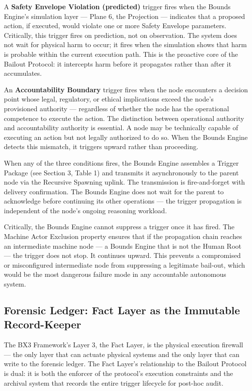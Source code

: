 A \textbf{Safety Envelope Violation (predicted)} trigger fires when the Bounds Engine's simulation layer — Plane 6, the Projection — indicates that a proposed action, if executed, would violate one or more Safety Envelope parameters. Critically, this trigger fires on prediction, not on observation. The system does not wait for physical harm to occur; it fires when the simulation shows that harm is probable within the current execution path. This is the proactive core of the Bailout Protocol: it intercepts harm before it propagates rather than after it accumulates.

An \textbf{Accountability Boundary} trigger fires when the node encounters a decision point whose legal, regulatory, or ethical implications exceed the node's provisioned authority — regardless of whether the node has the operational competence to execute the action. The distinction between operational authority and accountability authority is essential. A node may be technically capable of executing an action but not legally authorized to do so. When the Bounds Engine detects this mismatch, it triggers upward rather than proceeding.

When any of the three conditions fires, the Bounds Engine assembles a Trigger Package (see Section 3, Table 1) and transmits it asynchronously to the parent node via the Recursive Spawning uplink. The transmission is fire-and-forget with delivery confirmation. The Bounds Engine does not wait for the parent to acknowledge before continuing its other operations — the trigger propagation is independent of the node's ongoing reasoning workload.

Critically, the Bounds Engine cannot suppress a trigger once it has fired. The Machine Actor Exclusion property ensures that if the propagation chain reaches an intermediate machine node — a Bounds Engine that is not the Human Root — the trigger does not stop. It continues upward. This prevents a compromised or misconfigured intermediate node from suppressing a legitimate bail-out, which would be the most dangerous failure mode in any accountable autonomous system.

\subsection{Forensic Ledger: Fact Layer as the Immutable Record-Keeper}

The BX3 Framework's Layer 3, the Fact Layer, is the physical execution firewall — the only layer that can actuate physical systems and the only layer that can write to the forensic ledger. The Fact Layer's relationship to the Bailout Protocol is dual: it is both the enforcer of the protocol's execution constraints and the archival system that records the entire trigger lifecycle for post-hoc audit.

